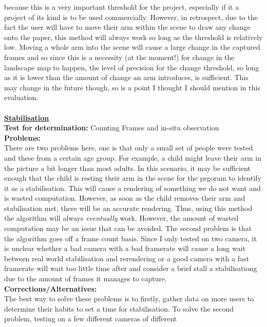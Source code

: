 \documentclass[11pt]{article}
\begin{document}
				because this is a very important threshold for the project,
				especially if it a project of its kind is to be used 
				commercially. However, in retrospect, due to the fact the
				user will have to move their arm within the scene to draw
				any change onto the paper, this method will always work
				so long as the threshold is relatively low. Moving a whole
				arm into the scene will cause a large change in the 
				captured frames and so since this is a necessity (at the
				moment!) for change in the landscape map to happen, the
				level of precision for the change threshold, so long as
				it is lower than the amount of change an arm introduces,
				is sufficient. This may change in the future though, so
				is a point I thought I should mention in this evaluation. \\
\\
\underline{\textbf{Stabilisation}}\\
\textbf{Test for determination:} Counting Frames and in-situ observation\\
\textbf{Problems:}\\ There are two problems here, 
			one is that only a small set of people
			were tested and these from a certain age group.
			For example, a child might leave their arm in the picture a bit
			longer than most adults. In this scenario, it may be sufficient
			enough that the child is resting their arm in the scene for the
			prgoram to identify it as a stabilisation. This will cause 
			a rendering of something we do not want and is wasted computation.
			However, as soon as the child removes their arm and stabilisation
			met, there will be an accurate rendering. Thus, using this method
			the algorithm will always \textit{eventually} work. However,
			the amount of wasted computation may be an issue that can
			be avoided. The second problem is that the algorithm goes off
			a frame count basis. Since I only tested on two camera, it is
			unclear whether a bad camera with a bad framerate will cause
			a long wait between real world stabilisation and rerendering or
			a good camera with a fast framerate will wait too little time 
			after and consider a brief stall a stabilisationg due to the
			amount of frames it manages to capture.\\
\textbf{Corrections/Alternatives:}\\ The best way to solve these problems
			is to firstly, gather data on more users to determine their
			habits to set a time for stabilisation. To solve the second
			problem, testing on a few different cameras of different
\end{document}
